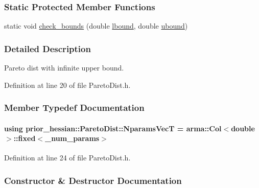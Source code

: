\subsubsection*{Static Protected Member Functions}
\begin{DoxyCompactItemize}
\item 
static void \hyperlink{classprior__hessian_1_1UnivariateDist_aec85554be4019eb2c5d92203a4e6d9f8}{check\+\_\+bounds} (double \hyperlink{classprior__hessian_1_1ParetoDist_ad117226a3ad1eee827886fc7ba38acbf}{lbound}, double \hyperlink{classprior__hessian_1_1ParetoDist_ae7edad795835ac57ed7046212e7b5fb6}{ubound})
\end{DoxyCompactItemize}


\subsubsection{Detailed Description}
Pareto dist with infinite upper bound. 



Definition at line 20 of file Pareto\+Dist.\+h.



\subsubsection{Member Typedef Documentation}
\paragraph[{\texorpdfstring{Nparams\+VecT}{NparamsVecT}}]{\setlength{\rightskip}{0pt plus 5cm}using {\bf prior\+\_\+hessian\+::\+Pareto\+Dist\+::\+Nparams\+VecT} =  arma\+::\+Col$<$double$>$\+::fixed$<$\+\_\+num\+\_\+params$>$}\hypertarget{classprior__hessian_1_1ParetoDist_a6ef572f82d7444830703d10f25007c3b}{}\label{classprior__hessian_1_1ParetoDist_a6ef572f82d7444830703d10f25007c3b}


Definition at line 24 of file Pareto\+Dist.\+h.



\subsubsection{Constructor \& Destructor Documentation}
